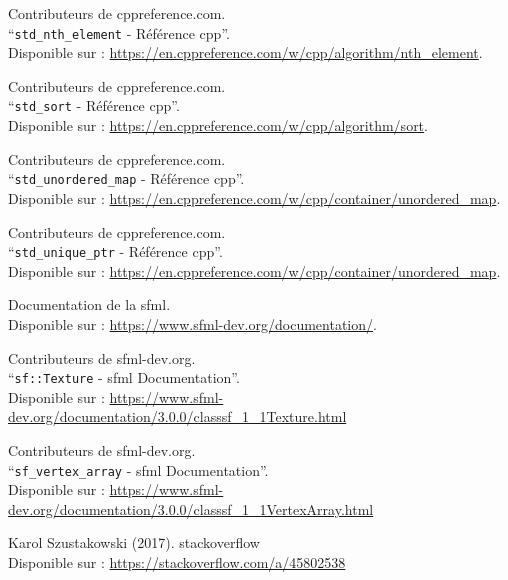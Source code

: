 \documentclass[a4paper,12pt]{report}
\begin{document}
\begin{thebibliography}{9}
        Contributeurs de cppreference.com.\\
        ``\texttt{\gls{std_nth_element}} - Référence \gls{cpp}''.\\
        Disponible sur : \url{https://en.cppreference.com/w/cpp/algorithm/nth_element}.

        Contributeurs de cppreference.com.\\
        ``\texttt{\gls{std_sort}} - Référence \gls{cpp}''.\\
        Disponible sur : \url{https://en.cppreference.com/w/cpp/algorithm/sort}.

        Contributeurs de cppreference.com.\\
        ``\texttt{\gls{std_unordered_map}} - Référence \gls{cpp}''.\\
        Disponible sur : \url{https://en.cppreference.com/w/cpp/container/unordered_map}.

        Contributeurs de cppreference.com.\\
        ``\texttt{\gls{std_unique_ptr}} - Référence \gls{cpp}''.\\
        Disponible sur : \url{https://en.cppreference.com/w/cpp/container/unordered_map}.

        Documentation de la \gls{sfml}. \\
        Disponible sur : \url{https://www.sfml-dev.org/documentation/}.

        Contributeurs de sfml-dev.org.\\
        ``\texttt{sf::Texture} - \gls{sfml} Documentation''.\\
        Disponible sur : \url{https://www.sfml-dev.org/documentation/3.0.0/classsf_1_1Texture.html}

        Contributeurs de sfml-dev.org.\\
        ``\texttt{\gls{sf_vertex_array}} - \gls{sfml} Documentation''.\\
        Disponible sur : \url{https://www.sfml-dev.org/documentation/3.0.0/classsf_1_1VertexArray.html}

        Karol Szustakowski (2017).
        \gls{stackoverflow} \\
        Disponible sur : \url{https://stackoverflow.com/a/45802538}
    \end{thebibliography}
\end{document}
